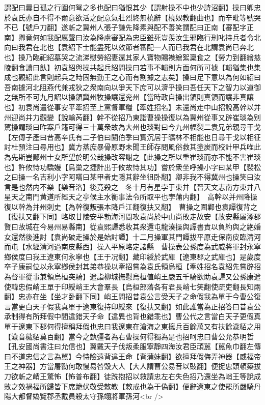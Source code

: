 謂配曰曩日孤之行圍何弩之多也配曰猶恨其少【謂射操不中也少詩沼翻】操曰卿忠於袁氏亦自不得不爾意欲活之配意氣壯烈終無橈辭【橈奴教翻曲也】而辛毗等號哭不已【號戶刀翻】遂斬之冀州人張子謙先降素與配不善笑謂配曰正南【審配字正南】卿竟何如我配厲聲曰汝為降虜審配為忠臣雖死豈羨汝生邪臨行刑叱持兵者令北向曰我君在北也【袁紹下士能盡死以效節者審配一人而已我君在北謂袁尚已奔北也】操乃臨祀紹墓哭之流涕慰勞紹妻還其家人寶物賜襍繒絮稟食之【勞力到翻繒慈陵翻食讀曰飤】初袁紹與操共起兵紹問操曰若事不輯則方面何所可據【輯猶集也集成也觀紹此言則起兵之時固無勤王之心而有割據之志矣】操曰足下意以為何如紹曰吾南據河北阻燕代兼戎狄之衆南向以爭天下庶可以濟乎操曰吾任天下之智力以道御之無所不可九月詔以操領冀州牧操讓還兖州【當時政自操出領則真領而讓非真讓也】初袁尚遣從事安平牽招至上黨督軍糧【牽姓招名】未還尚走中山招說高幹以并州迎尚并力觀變【說輸芮翻】幹不從招乃東詣曹操操復以為冀州從事又辟崔琰為别駕操謂琰曰昨案戶籍可得三十萬衆故為大州也琰對曰今九州幅裂二袁兄弟親尋干戈【左傳子產曰昔高辛氏有二子伯曰閼伯季曰實沉居于曠林不相能也日尋干戈以相征討杜預注曰尋用也】冀方蒸庶暴骨原野未聞王師存問風俗救其塗炭而校計甲兵唯此為先斯豈鄙州士女所望於明公哉操改容謝之【此操之所以重崔琰而亦不能不害崔琰也】許攸恃功驕嫚【烏巢之捷計出于攸故恃其功】嘗於衆坐呼操小字曰某甲【裴松之曰操一名吉利小字阿瞞曰某甲者史隱其辭坐徂卧翻】卿非我不得冀州也操笑曰汝言是也然内不樂【樂音洛】後竟殺之　冬十月有星孛于東井【晉天文志南方東井八星天之南門黄道所經天之亭候主水衡事法令所取平也孛蒲内翻】　高幹以并州降操復以幹為并州刺史【為幹復叛張本降戶江翻復扶又翻】　曹操之圍鄴也袁譚復背之【復扶又翻下同】略取甘陵安平勃海河間攻袁尚於中山尚敗走故安【故安縣屬涿郡賢曰故城在今易州易縣南】從袁熙譚悉收其衆還屯龍湊操與譚書責以負約與之絶婚女還然後進討【袁尚破走操於是始討譚】十二月操軍其門譚拔平原走保南皮臨清河而屯【水經清河過南皮縣西】操入平原略定諸縣　曹操表公孫度為武威將軍封永寧鄉侯度曰我王遼東何永寧也【王于况翻】藏印綬於武庫【遼東郡之武庫也】是歲度卒子康嗣位以永寧鄉侯封其弟恭操以牽招嘗為袁氏領烏桓【牽姓招名袁紹先嘗辟招為督軍從事兼領烏桓突騎】遣詣柳城撫慰烏桓值峭王嚴五千騎欲助袁譚又公孫康遣使韓忠假峭王單于印綬峭王大會羣長【烏桓部落各有君長峭七笑翻使疏吏翻長知兩翻】忠亦在坐【坐才卧翻下同】峭王問招昔袁公言受天子之命假我為單于今曹公復言當更白天子假我真單于遼東復持印綬來【復扶又翻】如此誰當為正招答曰昔袁公承制得有所拜假中間違錯天子命【違異也背也錯乖也】曹公代之言當白天子更假真單于遼東下郡何得擅稱拜假也忠曰我遼東在滄海之東擁兵百餘萬又有扶餘濊貊之用【濊音穢貊莫百翻】當今之埶彊者為右曹操何得獨為是也招呵忠曰曹公允恭明哲【孔安國尚書注曰允信也】翼戴天子伐叛柔服寧靜四海汝君臣頑嚚【嚚魚巾翻左傳曰不道忠信之言為嚚】今恃險遠背違王命【背蒲妹翻】欲擅拜假侮弄神器【威福帝王之神器】方當屠勠何敢慢易咎毁大人【大人謂曹公易音以䜴翻】便捉忠頭頓築拔刀欲斬之峭王驚怖【怖普布翻】徒跣抱招以救請忠左右失色招乃還坐為峭王等說成敗之效禍福所歸皆下席跪伏敬受敕教【敕戒也為于偽翻】便辭遼東之使罷所嚴騎丹陽大都督媯覽郡丞戴員殺太守孫翊將軍孫河<br />
